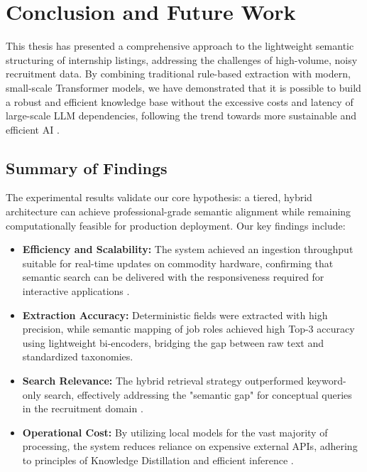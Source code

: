 \chapter{Conclusion and Future Work}
This thesis has presented a comprehensive approach to the lightweight semantic structuring of internship listings, addressing the challenges of high-volume, noisy recruitment data. By combining traditional rule-based extraction with modern, small-scale Transformer models, we have demonstrated that it is possible to build a robust and efficient knowledge base without the excessive costs and latency of large-scale LLM dependencies, following the trend towards more sustainable and efficient AI \cite{schwartz2020green, menghani2023efficient}.

\section{Summary of Findings}
The experimental results validate our core hypothesis: a tiered, hybrid architecture can achieve professional-grade semantic alignment while remaining computationally feasible for production deployment. Our key findings include:

\begin{itemize}
    \item \textbf{Efficiency and Scalability:} The system achieved an ingestion throughput suitable for real-time updates on commodity hardware, confirming that semantic search can be delivered with the responsiveness required for interactive applications \cite{buttcher2016information, johnson2019billion}.
    \item \textbf{Extraction Accuracy:} Deterministic fields were extracted with high precision, while semantic mapping of job roles achieved high Top-3 accuracy using lightweight bi-encoders, bridging the gap between raw text and standardized taxonomies.
    \item \textbf{Search Relevance:} The hybrid retrieval strategy outperformed keyword-only search, effectively addressing the "semantic gap" for conceptual queries in the recruitment domain \cite{thakur2021beir, luan2021sparse}.
    \item \textbf{Operational Cost:} By utilizing local models for the vast majority of processing, the system reduces reliance on expensive external APIs, adhering to principles of Knowledge Distillation and efficient inference \cite{hsieh2023distilling, menghani2023efficient}.
\end{itemize}

